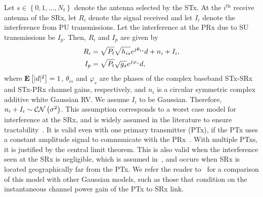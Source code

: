 \documentclass[12pt,draftcls,peerreview,onecolumn]{IEEEtran}
\newcommand{\CN}{{\cal CN}}
\newcommand{\expect}[1]{{\bf{E}}\left[{#1}\right]}
\newcommand{\nx}{{0}}
\newcommand{\Nt}{{N_t}}
\newcommand{\Pt}{{P_t}}
\newcommand{\such}{h}
\newcommand{\puch}{g}
\newcommand{\hk}[1]{{\such_{#1}}}
\newcommand{\gk}[1]{{\puch_{#1}}}
\newcommand{\Rsrx}{R_{i}}
\newcommand{\Iprx}{I_{p}}
\newcommand{\Isrx}{I_{i}}
\newcommand{\noise}{n_i}
\newcommand{\noisevar}{\sigma^2}
\newcommand{\allopts}{\left\{\nx,1,\ldots,\Nt\right\}}
\newcommand{\suchph}{\theta}
\newcommand{\puchph}{\varphi}
\newcommand{\thetahk}{\suchph_{is}}
\newcommand{\thetagk}{\puchph_{s}}
\newcommand{\ith}{i^{\text{th}}}
\begin{document}
Let $s\in\allopts$ denote the antenna selected by the STx. %
 At the $\ith$ receive antenna of the SRx, let $\Rsrx$ denote the signal received and let $\Isrx$ denote the interference from PU transmissions. Let the interference at the PRx due to SU transmissions be $\Iprx$. Then, $\Rsrx$ and $\Iprx$ are given by
%
\begin{align}
\label{eq:r_su}
 \Rsrx &= \sqrt{\Pt}\sqrt{\hk{is}} e^{j\thetahk} \datasymbol + \noise + \Isrx, \\
 \label{eq:i}
 \Iprx &= \sqrt{\Pt}\sqrt{\gk{s}} e^{j\thetagk} \datasymbol ,
\end{align}
%
where $\expect{|\datasymbol|^2}=1$, $\thetahk$ and $\thetagk$ are the phases of the complex baseband STx-SRx and STx-PRx channel gains, respectively, and $\noise$ is a circular symmetric complex additive white Gaussian RV. We assume $\Isrx$ to be Gaussian. Therefore, $\noise + \Isrx\sim \CN\left(\noisevar\right)$. This assumption corresponds to a worst case model for interference at the SRx, and is widely assumed in the literature to ensure tractability~\cite{Sarvendranath_2013_TCOM,Wang_2011_TCom, Kashyap_2014_TCOM,Sarvendranath_2014_TCOM}. It is valid even with one primary transmitter (PTx), if the PTx uses a constant amplitude signal to communicate with the PRx~\cite{Kashyap_2014_TCOM}. With multiple PTxs, it is justified by the central limit theorem. This is also valid when the interference seen at the SRx is negligible, which is assumed in~\cite{musavian_2009_tcom,RZhang_2009_TWC,li_2011_pimrc}, and occurs when SRx is located geographically far from the PTx. We refer the reader to~\cite{das_2015_twc} for a comparison of this model with other Gaussian models, such as those that condition on the instantaneous channel power gain of the PTx to SRx link. 
\end{document}
